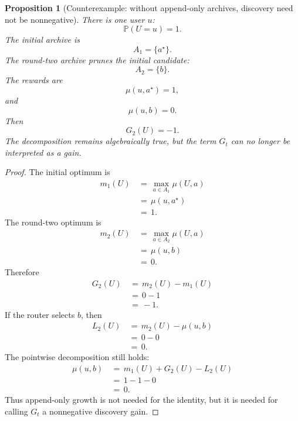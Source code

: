 \documentclass{article} %
\newtheorem{proposition}[theorem]{Proposition}
\begin{document}
\begin{proposition}[Counterexample: without append-only archives, discovery need not be nonnegative]
\label{prop:11}
There is one user \(u\):
\begin{equation}
\label{eq:app-fourth-prune-user}
\mathbb{P}(U=u)=1.
\end{equation}
The initial archive is
\begin{equation}
\label{eq:app-fourth-prune-a1}
A_1=\{a^\star\}.
\end{equation}
The round-two archive prunes the initial candidate:
\begin{equation}
\label{eq:app-fourth-prune-a2}
A_2=\{b\}.
\end{equation}
The rewards are
\begin{equation}
\label{eq:app-fourth-prune-mu-star}
\mu(u,a^\star)=1,
\end{equation}
and
\begin{equation}
\label{eq:app-fourth-prune-mu-b}
\mu(u,b)=0.
\end{equation}
Then
\begin{equation}
\label{eq:app-fourth-prune-g-negative}
G_2(U)=-1.
\end{equation}
The decomposition remains algebraically true, but the term \(G_t\) can no longer be interpreted as a gain.
\end{proposition}

\begin{proof}
The initial optimum is
\begin{align}
\label{eq:app-fourth-prune-proof-m1}
m_1(U)
&\,=\,
\max_{a\in A_1}\mu(U,a)
\\
&\,=\,
\mu(u,a^\star)
\\
&\,=\,
1.
\end{align}
The round-two optimum is
\begin{align}
\label{eq:app-fourth-prune-proof-m2}
m_2(U)
&\,=\,
\max_{a\in A_2}\mu(U,a)
\\
&\,=\,
\mu(u,b)
\\
&\,=\,
0.
\end{align}
Therefore
\begin{align}
\label{eq:app-fourth-prune-proof-g}
G_2(U)
&\,=\,
m_2(U)-m_1(U)
\\
&\,=\,
0-1
\\
&\,=\,
-1.
\end{align}
If the router selects \(b\), then
\begin{align}
\label{eq:app-fourth-prune-proof-l}
L_2(U)
&\,=\,
m_2(U)-\mu(u,b)
\\
&\,=\,
0-0
\\
&\,=\,
0.
\end{align}
The pointwise decomposition still holds:
\begin{align}
\label{eq:app-fourth-prune-proof-decomp}
\mu(u,b)
&\,=\,
m_1(U)+G_2(U)-L_2(U)
\\
&\,=\,
1-1-0
\\
&\,=\,
0.
\end{align}
Thus append-only growth is not needed for the identity, but it is needed for calling \(G_t\) a nonnegative discovery gain.
\end{proof}
\end{document}
